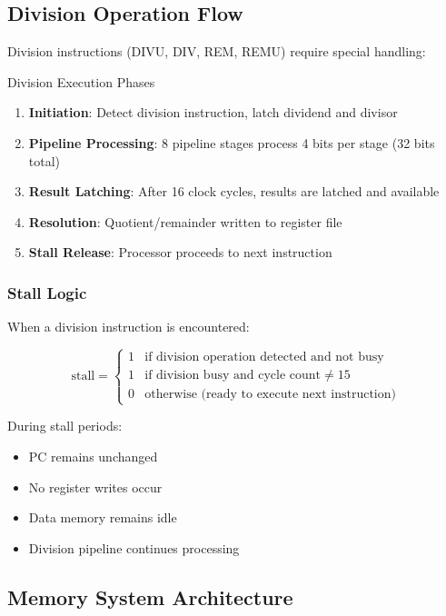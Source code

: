 \documentclass[a4paper, 11pt]{article}
\begin{document}
\subsection{Division Operation Flow}

Division instructions (DIVU, DIV, REM, REMU) require special handling:

\begin{myblock}{Division Execution Phases}
\begin{enumerate}
    \item \textbf{Initiation}: Detect division instruction, latch dividend and divisor
    \item \textbf{Pipeline Processing}: 8 pipeline stages process 4 bits per stage (32 bits total)
    \item \textbf{Result Latching}: After 16 clock cycles, results are latched and available
    \item \textbf{Resolution}: Quotient/remainder written to register file
    \item \textbf{Stall Release}: Processor proceeds to next instruction
\end{enumerate}
\end{myblock}

\subsubsection{Stall Logic}
When a division instruction is encountered:

\begin{equation}
\text{stall} = \begin{cases}
1 & \text{if division operation detected and not busy} \\
1 & \text{if division busy and cycle count} \neq 15 \\
0 & \text{otherwise (ready to execute next instruction)}
\end{cases}
\end{equation}

During stall periods:
\begin{itemize}
    \item PC remains unchanged
    \item No register writes occur
    \item Data memory remains idle
    \item Division pipeline continues processing
\end{itemize}

\subsection{Memory System Architecture}
\end{document}
